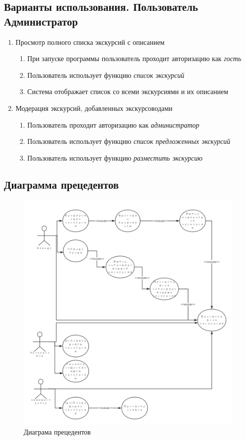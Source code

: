 \documentclass[12pt,a4paper]{article}
\begin{document}
\subsection{Варианты использования. Пользователь Администратор}
\begin{enumerate}
\item Просмотр полного списка экскурсий с описанием
\begin{enumerate}
\item При запуске программы пользователь проходит авторизацию как \textit{гость}
\item Пользователь использует функцию \textit{список экскурсий}
\item Система отображает список со всеми экскурсиями и их описанием
\end{enumerate}
\item Модерация экскурсий, добавленных экскурсоводами
\begin{enumerate}
\item Пользователь проходит авторизацию как \textit{администратор}
\item Пользователь использует функцию \textit{список предложенных экскурсий}
\item Пользователь использует функцию \textit{разместить экскурсию}
\end{enumerate}
\end{enumerate}
\subsection{Диаграмма прецедентов}
\begin{figure}[h!]
\centering
\includegraphics[scale=0.5]{res/usecase}
\caption{Диаграма прецедентов}
\end{figure}
\newpage
\end{document}
